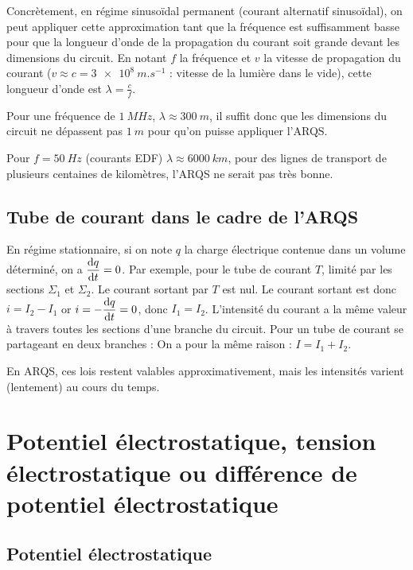 Concrètement, en régime sinusoïdal permanent (courant alternatif sinusoïdal), 
on peut appliquer cette approximation tant que la fréquence est suffisamment 
basse pour que la longueur d'onde de la propagation du courant soit grande 
devant les dimensions du circuit. En notant \(f\) la fréquence et \(v\) la 
vitesse de propagation du courant (\(v\approx c = \SI{3e8}{m.s^{-1}}\) : 
vitesse de la lumière dans le vide), cette longueur d'onde est \(\lambda = 
\frac{c}{f}\).

Pour une fréquence de \(\SI{1}{MHz}\), \(\lambda \approx \SI{300}{m}\), il 
suffit donc que les dimensions du circuit ne dépassent pas \(\SI{1}{m}\) pour 
qu'on puisse appliquer l'ARQS.

Pour \(f=\SI{50}{Hz}\) (courants EDF) \(\lambda \approx \SI{6000}{km}\), pour 
des lignes de transport de plusieurs centaines de kilomètres, l'ARQS ne serait 
pas très bonne.

\subsection{Tube de courant dans le cadre de l'ARQS}%
\label{chap9-subsec:TubedeCourantARQS}%

En régime stationnaire, si on note \(q\) la charge électrique contenue dans un 
volume déterminé, on a \(\dfrac{\mathrm{d} q}{\mathrm{d} t}=0\). Par exemple, pour le tube de 
courant \(T\), limité par les sections \(\Sigma_1\) et \(\Sigma_2\). Le courant 
sortant par \(T\) est nul. Le courant sortant est donc \(i = I_2 - I_1\) or 
\(i=-\dfrac{\mathrm{d} q}{\mathrm{d} t}=0\), donc \(I_1 = I_2\). L'intensité du courant a la même 
valeur à travers toutes les sections d'une branche du circuit. Pour un tube de 
courant se partageant en deux branches : On a pour la même raison : \(I = I_1 + 
I_2\).

En ARQS, ces lois restent valables approximativement, mais les intensités 
varient (lentement) au cours du temps.

\section{Potentiel électrostatique, tension électrostatique ou différence de 
potentiel électrostatique}%
\label{chap9-sec:potentiel}%

\subsection{Potentiel électrostatique}%
\label{chap9-subsec:potentiel}%


